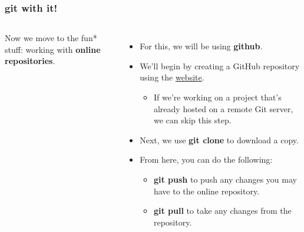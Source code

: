 \documentclass{beamer}
\begin{document}
\begin{frame}
\frametitle{\textbf{git} with it!}
\begin{columns}
Now we move to the fun* stuff: working with \textbf{online repositories}.
\begin{itemize}
\item For this, we will be using \textbf{github}.
\item We'll begin by creating a GitHub repository using the \href{www.github.com}{website}.
\begin{itemize}
\item If we're working on a project that's already hosted on a remote Git server, we can skip this step.
\end{itemize}
\item Next, we use \textbf{git clone} to download a copy.
\item From here, you can do the following:
\begin{itemize}
\item \textbf{git push} to push any changes you may have to the online repository.
\item \textbf{git pull} to take any changes from the repository.
\end{itemize}
\end{itemize}

\end{columns}
\end{frame}
\end{document}
